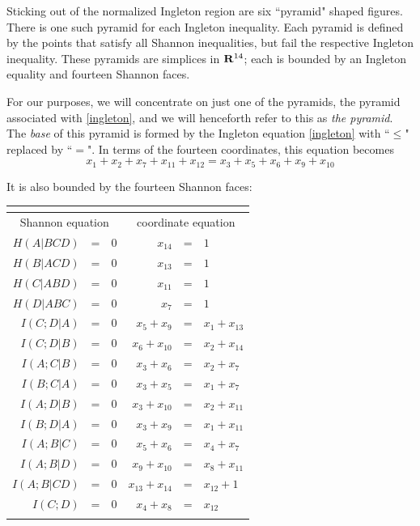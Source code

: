 \documentclass[10pt,journal]{IEEEtran}
\begin{document}
Sticking out of the normalized Ingleton region are six ``pyramid" shaped figures.  There is one such pyramid for
each Ingleton inequality.  Each pyramid is defined by the points that satisfy all Shannon inequalities, but fail the
respective Ingleton inequality.  These pyramids are simplices in $\mathbf{R}^{14}$;
each is bounded by an Ingleton equality and fourteen Shannon faces.

For our purposes, we will concentrate on just one of the pyramids, the pyramid associated with \eqref{ingleton},
and we will henceforth refer to this as \textit{the pyramid}. The \textit{base} of this pyramid is formed by the
Ingleton equation \eqref{ingleton} with ``$\leq$" replaced by ``$=$".  In terms of the fourteen coordinates, this equation becomes
\begin{equation}\label{eq:Ingleton}
x_{1}+x_{2}+x_{7}+x_{11}+x_{12}=x_{3}+x_{5}+x_{6}+x_{9}+x_{10}
\end{equation}

It is also bounded by the fourteen Shannon faces:

\begin{tabular}{|rcc|rcl|}
\multicolumn{6}{c}{}\\
\hline
\multicolumn{3}{|c|}{Shannon equation}& \multicolumn{3}{c|}{coordinate equation}\\
\hline
$H(A|BCD)$&=&$0$ & $x_{14}$&=&$1$\\
$H(B|ACD)$&=&$0$ & $x_{13}$&=&$1$\\
$H(C|ABD)$&=&$0$ & $x_{11}$&=&$1$\\
$H(D|ABC)$&=&$0$ & $x_{7}$&=&$1$\\
$I(C;D|A)$&=&$0$ & $x_{5}+x_{9}$&=&$x_{1}+x_{13}$\\
$I(C;D|B)$&=&$0$ & $x_{6}+x_{10}$&=&$x_{2}+x_{14}$\\
$I(A;C|B)$&=&$0$ & $x_{3}+x_{6}$&=&$x_{2}+x_{7}$\\
$I(B;C|A)$&=&$0$ & $x_{3}+x_{5}$&=&$x_{1}+x_{7}$\\
$I(A;D|B)$&=&$0$ & $x_{3}+x_{10}$&=&$x_{2}+x_{11}$\\
$I(B;D|A)$&=&$0$ & $x_{3}+x_{9}$&=&$x_{1}+x_{11}$\\
$I(A;B|C)$&=&$0$ & $x_{5}+x_{6}$&=&$x_{4}+x_{7}$\\
$I(A;B|D)$&=&$0$ & $x_{9}+x_{10}$&=&$x_{8}+x_{11}$\\
$I(A;B|CD)$&=&$0$ & $x_{13}+x_{14}$&=&$x_{12}+1$\\
$I(C;D)$&=&$0$ & $x_4+x_8$&=&$x_{12}$\\
\hline
\multicolumn{6}{c}{}\\
\end{tabular}
\end{document}
